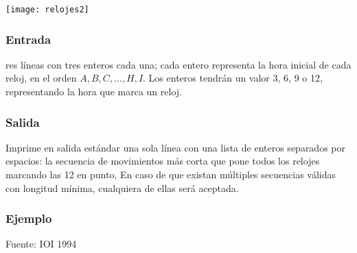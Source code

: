 \begin{center}
	\texttt{[image: relojes2]}
\end{center}

\subsubsection*{Entrada}
res líneas con tres enteros cada una; cada entero representa la hora inicial de cada reloj, en el orden \(A, B, C, \ldots, H, I\). Los enteros tendrán un valor 3, 6, 9 o 12, representando la hora que marca un reloj.

\subsubsection*{Salida}
Imprime en salida estándar una sola línea con una lista de enteros separados por espacios: la secuencia de movimientos más corta que pone todos los relojes marcando las 12 en punto. En caso de que existan múltiples secuencias válidas con longitud mínima, cualquiera de ellas será aceptada.

\subsubsection*{Ejemplo}
\begin{casebox2}
\end{casebox2}

Fuente: IOI 1994





